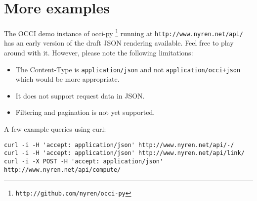\documentclass[10pt,a4paper]{article}
\begin{document}
\section{More examples}
The OCCI demo instance of occi-py%
\footnote{\tt http://github.com/nyren/occi-py}
running at {\tt http://www.nyren.net/api/} has an early version of the draft
JSON rendering available.  Feel free to play around with it. However, please
note the following limitations:
\begin{itemize}
\item The Content-Type is {\tt application/json} and not {\tt application/occi+json}
which would be more appropriate.
\item It does not support request data in JSON.
\item Filtering and pagination is not yet supported.
\end{itemize}

A few example queries using curl:
\begin{verbatim}
curl -i -H 'accept: application/json' http://www.nyren.net/api/-/
curl -i -H 'accept: application/json' http://www.nyren.net/api/link/
curl -i -X POST -H 'accept: application/json' http://www.nyren.net/api/compute/
\end{verbatim}
\end{document}
